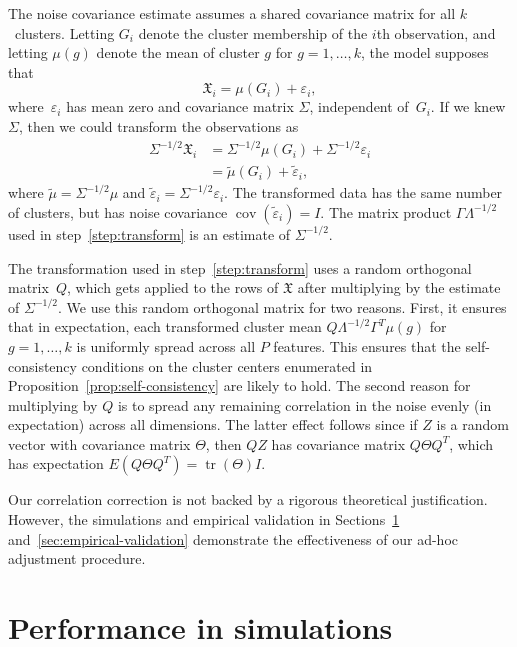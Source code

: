 \documentclass[12pt]{article}
\DeclareMathOperator*{\cov}{cov}
\DeclareMathOperator*{\tr}{tr}
\newcommand{\T}{T}
\newcommand{\dataX}{\mathfrak{X}}
\begin{document}
The noise covariance estimate assumes a shared covariance matrix for all
$k$~clusters. Letting $G_i$ denote the cluster membership of the $i$th
observation, and letting $\mu(g)$ denote the mean of cluster $g$ for $g = 1,
\dotsc, k$, the model supposes that
\[
  \dataX_i = \mu(G_i)+\varepsilon_i,
\]
where~$\varepsilon_i$ has mean zero and covariance matrix $\Sigma$, independent
of~$G_i$. If we knew $\Sigma$, then we could transform the observations as
\begin{align*}
  \Sigma^{-1/2} \dataX_i
    &= \Sigma^{-1/2} \mu(G_i) + \Sigma^{-1/2} \varepsilon_i \\
    &= \tilde \mu(G_i) + \tilde \varepsilon_i,
\end{align*}
where $\tilde \mu = \Sigma^{-1/2} \mu$ and
$\tilde \varepsilon_i = \Sigma^{-1/2} \varepsilon_i$. The transformed data
has the same number of clusters, but has noise covariance
$\cov(\tilde \varepsilon_i) = I$. The matrix product $\Gamma \Lambda^{-1/2}$
used in step~\ref{step:transform} is an estimate of $\Sigma^{-1/2}$.


The transformation used in step~\ref{step:transform} uses a random orthogonal
matrix~$Q$, which gets applied to the rows of $\dataX$ after 
multiplying by the estimate of $\Sigma^{-1/2}$. We use this random orthogonal
matrix for two reasons. First, it ensures that in expectation, each transformed cluster mean
$Q \Lambda^{-1/2} \Gamma^\T \mu(g)$ for $g = 1, \dotsc, k$ is uniformly
spread across all $P$ features. This ensures that the self-consistency
conditions on the cluster centers enumerated in Proposition~\ref{prop:self-consistency}
are likely to hold. The second reason for multiplying by $Q$ is to spread any
remaining correlation in the noise evenly (in expectation) across all
dimensions. The latter effect follows since if $Z$ is a random vector with
covariance matrix $\Theta$, then $Q Z$ has covariance matrix $Q \Theta Q^\T$,
which has expectation $E(Q \Theta Q^\T) = \tr(\Theta) I$.


Our correlation correction is not backed by a rigorous theoretical
justification. However, the simulations and empirical validation in
Sections~\ref{sec:simulations} and~\ref{sec:empirical-validation}
demonstrate the effectiveness of our ad-hoc adjustment procedure.


\section{Performance in simulations}
\label{sec:simulations}
\end{document}
